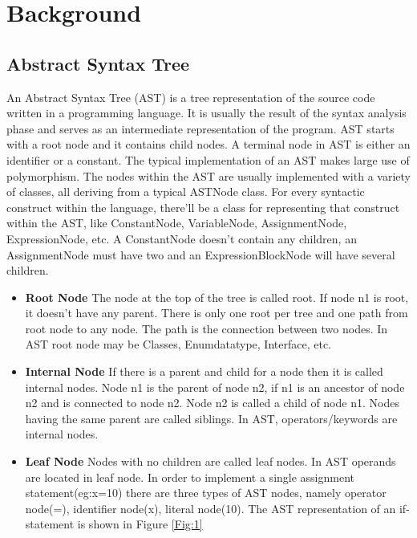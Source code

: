 \doubleSpacing
\chapter{Background}

\section{Abstract Syntax Tree}
 An Abstract Syntax Tree (AST) is a tree representation of the  source code written in a programming language. It is usually the result of the syntax analysis phase and serves as an intermediate representation of the program. 
AST starts with a root node and it contains child nodes. A terminal node in AST is either an identifier or a constant. The typical implementation of an AST makes large use of polymorphism. The nodes within the AST are usually implemented with a variety of classes, all deriving from a typical ASTNode class. For every syntactic construct within the language, there'll be a class for representing that construct within the AST, like ConstantNode, VariableNode, AssignmentNode, ExpressionNode, etc. A ConstantNode doesn't contain any children, an AssignmentNode must have two and an ExpressionBlockNode will have several children.
\begin{itemize}
	\item \textbf{Root Node}
The node at the top of the tree is called root. If node n1 is root, it doesn't have any parent. There is only one root per tree and one path from root node to any node. The path is the connection between two nodes. In AST root node may be Classes, Enumdatatype, Interface, etc.
\item \textbf{Internal Node}
If there is a parent and child for a node then it is called internal nodes. Node n1 is the parent of node n2, if n1 is an ancestor of node n2 and is
connected to node n2. Node n2 is called a child of node n1. Nodes having the same parent are called siblings. In AST, operators/keywords are internal nodes.
\item \textbf{Leaf Node}
Nodes with no children are called leaf nodes. In AST operands are located in leaf node. In order to implement a single assignment statement(eg:x=10) there are three types of AST nodes, namely operator node(=), identifier node(x), literal node(10). The AST representation of an if-statement is shown in Figure \ref{Fig:1}
\end{itemize}

